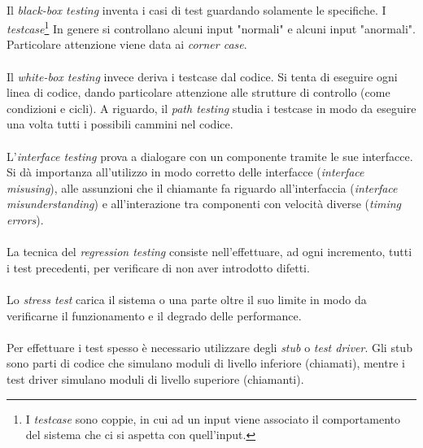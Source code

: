 \documentclass[11pt,a4paper,english]{article}
\begin{document}
\paragraph{} Il \emph{black-box testing} inventa i casi di test guardando solamente le specifiche. I \emph{testcase}\footnote{I \emph{testcase} sono coppie, in cui ad un input viene associato il comportamento del sistema che ci si aspetta con quell'input.} In genere si controllano alcuni input "normali" e alcuni input "anormali". Particolare attenzione viene data ai \emph{corner case}. 

\paragraph{} Il \emph{white-box testing} invece deriva i testcase dal codice. Si tenta di eseguire ogni linea di codice, dando particolare attenzione alle strutture di controllo (come condizioni e cicli). A riguardo, il \emph{path testing} studia i testcase in modo da eseguire una volta tutti i possibili cammini nel codice. 

\paragraph{} L'\emph{interface testing} prova a dialogare con un componente tramite le sue interfacce. Si dà importanza all'utilizzo in modo corretto delle interfacce (\emph{interface misusing}), alle assunzioni che il chiamante fa riguardo all'interfaccia (\emph{interface misunderstanding}) e all'interazione tra componenti con velocità diverse (\emph{timing errors}).

\paragraph{} La tecnica del \emph{regression testing} consiste nell'effettuare, ad ogni incremento, tutti i test precedenti, per verificare di non aver introdotto difetti.

\paragraph{} Lo \emph{stress test} carica il sistema o una parte oltre il suo limite in modo da verificarne il funzionamento e il degrado delle performance.

\paragraph{} Per effettuare i test spesso è necessario utilizzare degli \emph{stub} o \emph{test driver}. Gli stub sono parti di codice che simulano moduli di livello inferiore (chiamati), mentre i test driver simulano moduli di livello superiore (chiamanti).
\end{document}
